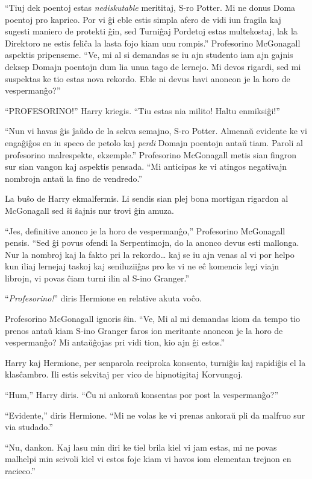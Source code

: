 ``Tiuj dek poentoj estas \emph{nediskutable} merititaj, S-ro
Potter. Mi ne donus Doma poentoj pro kaprico. Por vi ĝi eble estis
simpla afero de vidi iun fragila kaj sugesti maniero de protekti ĝin,
sed Turniĝaj Pordetoj estas multekostaj, lak la Direktoro ne estis
feliĉa la lasta fojo kiam unu rompis.'' Profesorino McGonagall
aspektis pripenseme. ``Ve, mi al si demandas se iu ajn studento iam
ajn gajnis deksep Domajn poentojn dum lia unua tago de lernejo. Mi
devos rigardi, sed mi suspektas ke tio estas nova rekordo. Eble ni
devus havi anoncon je la horo de vespermanĝo?''

``PROFESORINO!'' Harry kriegis. ``Tiu estas nia milito! Haltu
enmiksiĝi!''

``Nun vi havas ĝis ĵaŭdo de la sekva semajno, S-ro Potter. Almenaŭ
evidente ke vi engaĝiĝos en iu speco de petolo kaj \emph{perdi}
Domajn poentojn antaŭ tiam. Paroli al profesorino malrespekte,
ekzemple.'' Profesorino McGonagall metis sian fingron sur sian vangon
kaj aspektis pensada. ``Mi anticipas ke vi atingos negativajn nombrojn
antaŭ la fino de vendredo.''

La buŝo de Harry ekmalfermis. Li sendis sian plej bona mortigan
rigardon al McGonagall sed ŝi ŝajnis nur trovi ĝin amuza.

``Jes, definitive anonco je la horo de vespermanĝo,'' Profesorino
McGonagall pensis. ``Sed ĝi povus ofendi la Serpentimojn, do la anonco
devus esti mallonga. Nur la nombroj kaj la fakto pri la rekordo\ldots
kaj se iu ajn venas al vi por helpo kun iliaj lernejaj taskoj kaj
seniluziiĝas pro ke vi ne eĉ komencis legi viajn librojn, vi povas
ĉiam turni ilin al S-ino Granger.''

``\emph{Profesorino!}'' diris Hermione en relative akuta voĉo.

Profesorino McGonagall ignoris ŝin. ``Ve, Mi al mi demandas kiom da
tempo tio prenos antaŭ kiam S-ino Granger faros ion meritante anoncon
je la horo de vespermanĝo? Mi antaŭĝojas pri vidi tion, kio ajn ĝi
estos.''

Harry kaj Hermione, per senparola reciproka konsento, turniĝis kaj
rapidiĝis el la klasĉambro. Ili estis sekvitaj per vico de
hipnotigitaj Korvungoj.

``Hum,'' Harry diris. ``Ĉu ni ankoraŭ konsentas por post la vespermanĝo?''

``Evidente,'' diris Hermione. ``Mi ne volas ke vi prenas ankoraŭ pli
da malfruo sur via studado.''

``Nu, dankon. Kaj lasu min diri ke tiel brila kiel vi jam estas, mi ne
povas malhelpi min scivoli kiel vi estos foje kiam vi havos iom
elementan trejnon en racieco.''

